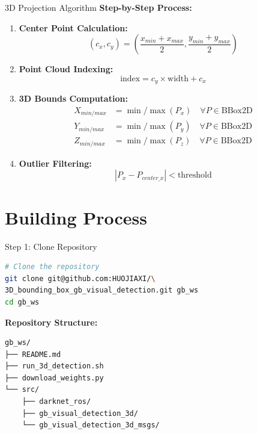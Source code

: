 \documentclass[aspectratio=169]{beamer}
\begin{document}
\begin{frame}{3D Projection Algorithm}
\textbf{Step-by-Step Process:}

\begin{enumerate}
    \item \textbf{Center Point Calculation:}
    \begin{equation*}
    (c_x, c_y) = \left(\frac{x_{min} + x_{max}}{2}, \frac{y_{min} + y_{max}}{2}\right)
    \end{equation*}

    \item \textbf{Point Cloud Indexing:}
    \begin{equation*}
    \text{index} = c_y \times \text{width} + c_x
    \end{equation*}

    \item \textbf{3D Bounds Computation:}
    \begin{equation*}
    \begin{aligned}
    X_{min/max} &= \min/\max(P_x) \quad \forall P \in \text{BBox2D} \\
    Y_{min/max} &= \min/\max(P_y) \quad \forall P \in \text{BBox2D} \\
    Z_{min/max} &= \min/\max(P_z) \quad \forall P \in \text{BBox2D}
    \end{aligned}
    \end{equation*}

    \item \textbf{Outlier Filtering:}
    \begin{equation*}
    |P_x - P_{center\_x}| < \text{threshold}
    \end{equation*}
\end{enumerate}
\end{frame}

\section{Building Process}

\begin{frame}[fragile]{Step 1: Clone Repository}
\begin{lstlisting}[language=bash]
# Clone the repository
git clone git@github.com:HUOJIAXI/\
3D_bounding_box_gb_visual_detection.git gb_ws
cd gb_ws
\end{lstlisting}

\vspace{1em}
\textbf{Repository Structure:}
\begin{lstlisting}[basicstyle=\tiny\ttfamily]
gb_ws/
├── README.md
├── run_3d_detection.sh
├── download_weights.py
└── src/
    ├── darknet_ros/
    ├── gb_visual_detection_3d/
    └── gb_visual_detection_3d_msgs/
\end{lstlisting}
\end{frame}
\end{document}
